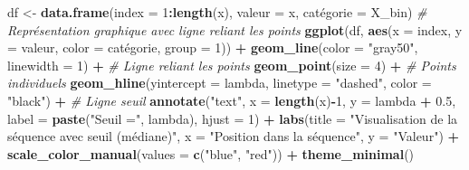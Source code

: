 \documentclass[
  12pt,
]{article}
\newenvironment{Shaded}{\begin{snugshade}}{\end{snugshade}}
\newcommand{\AttributeTok}[1]{\textcolor[rgb]{0.13,0.29,0.53}{#1}}
\newcommand{\CommentTok}[1]{\textcolor[rgb]{0.56,0.35,0.01}{\textit{#1}}}
\newcommand{\DecValTok}[1]{\textcolor[rgb]{0.00,0.00,0.81}{#1}}
\newcommand{\FloatTok}[1]{\textcolor[rgb]{0.00,0.00,0.81}{#1}}
\newcommand{\FunctionTok}[1]{\textcolor[rgb]{0.13,0.29,0.53}{\textbf{#1}}}
\newcommand{\NormalTok}[1]{#1}
\newcommand{\OtherTok}[1]{\textcolor[rgb]{0.56,0.35,0.01}{#1}}
\newcommand{\SpecialCharTok}[1]{\textcolor[rgb]{0.81,0.36,0.00}{\textbf{#1}}}
\newcommand{\StringTok}[1]{\textcolor[rgb]{0.31,0.60,0.02}{#1}}
\begin{document}
\begin{Shaded}
\begin{Highlighting}[]
\NormalTok{df }\OtherTok{\textless{}{-}} \FunctionTok{data.frame}\NormalTok{(}\AttributeTok{index =} \DecValTok{1}\SpecialCharTok{:}\FunctionTok{length}\NormalTok{(x), }\AttributeTok{valeur =}\NormalTok{ x, catégorie }\OtherTok{=}\NormalTok{ X\_bin)}
\CommentTok{\# Représentation graphique avec ligne reliant les points}
\FunctionTok{ggplot}\NormalTok{(df, }\FunctionTok{aes}\NormalTok{(}\AttributeTok{x =}\NormalTok{ index, }\AttributeTok{y =}\NormalTok{ valeur, }\AttributeTok{color =}\NormalTok{ catégorie, }\AttributeTok{group =} \DecValTok{1}\NormalTok{)) }\SpecialCharTok{+}
  \FunctionTok{geom\_line}\NormalTok{(}\AttributeTok{color =} \StringTok{"gray50"}\NormalTok{, }\AttributeTok{linewidth =} \DecValTok{1}\NormalTok{) }\SpecialCharTok{+}       \CommentTok{\# Ligne reliant les points}
  \FunctionTok{geom\_point}\NormalTok{(}\AttributeTok{size =} \DecValTok{4}\NormalTok{) }\SpecialCharTok{+}                              \CommentTok{\# Points individuels}
  \FunctionTok{geom\_hline}\NormalTok{(}\AttributeTok{yintercept =}\NormalTok{ lambda, }\AttributeTok{linetype =} \StringTok{"dashed"}\NormalTok{, }\AttributeTok{color =} \StringTok{"black"}\NormalTok{) }\SpecialCharTok{+} \CommentTok{\# Ligne seuil}
  \FunctionTok{annotate}\NormalTok{(}\StringTok{"text"}\NormalTok{, }\AttributeTok{x =} \FunctionTok{length}\NormalTok{(x)}\SpecialCharTok{{-}}\DecValTok{1}\NormalTok{, }\AttributeTok{y =}\NormalTok{ lambda }\SpecialCharTok{+} \FloatTok{0.5}\NormalTok{, }
           \AttributeTok{label =} \FunctionTok{paste}\NormalTok{(}\StringTok{"Seuil ="}\NormalTok{, lambda), }\AttributeTok{hjust =} \DecValTok{1}\NormalTok{) }\SpecialCharTok{+}
  \FunctionTok{labs}\NormalTok{(}\AttributeTok{title =} \StringTok{"Visualisation de la séquence avec seuil (médiane)"}\NormalTok{,}
       \AttributeTok{x =} \StringTok{"Position dans la séquence"}\NormalTok{,}
       \AttributeTok{y =} \StringTok{"Valeur"}\NormalTok{) }\SpecialCharTok{+}
  \FunctionTok{scale\_color\_manual}\NormalTok{(}\AttributeTok{values =} \FunctionTok{c}\NormalTok{(}\StringTok{"blue"}\NormalTok{, }\StringTok{"red"}\NormalTok{)) }\SpecialCharTok{+}
  \FunctionTok{theme\_minimal}\NormalTok{()}
\end{Highlighting}
\end{Shaded}
\end{document}
